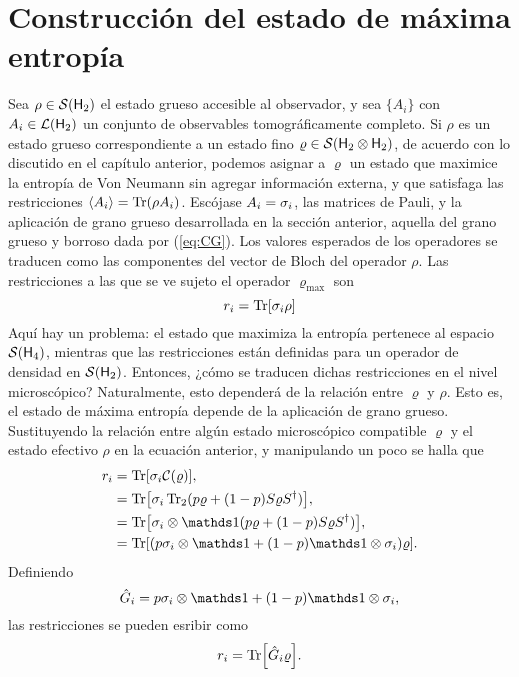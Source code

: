 \section{Construcción del estado de máxima entropía}

Sea $\rho\in\mathcal{S}({\sf H}_{2})$ el estado grueso accesible al observador, y sea $\{A_{i}\}$ con $A_{i}\in\mathcal{L}({\sf H}_{2})$ un conjunto de observables tomográficamente completo. Si $\rho$ es un estado grueso correspondiente a un estado fino $\varrho\in\mathcal{S}({\sf H}_{2}\otimes{\sf H}_{2})$, de acuerdo con lo discutido en el capítulo anterior, podemos asignar a $\varrho$ un estado que maximice la entropía de Von Neumann sin agregar información externa, y que satisfaga las restricciones $\expval{A_{i}}=\Tr(\rho A_{i})$.
Escójase ${A_{i}}={\sigma_{i}}$, las matrices de Pauli, y la aplicación de grano grueso desarrollada en la sección anterior, aquella del grano grueso y borroso dada por (\ref{eq:CG}). Los valores esperados de los operadores se traducen como las componentes del vector de Bloch del operador $\rho$. Las restricciones a las que se ve sujeto el operador $\varrho_{\max}$ son
\begin{equation*}
    r_{i}=\Tr[\sigma_{i}\rho]
\end{equation*}
Aquí hay un problema: el estado que maximiza la entropía pertenece al espacio $\mathcal{S}({\sf H}_{4})$, mientras que las restricciones están definidas para un operador de densidad en $\mathcal{S}({\sf H}_{2})$. Entonces, ¿cómo se traducen dichas restricciones en el nivel microscópico? Naturalmente, esto dependerá de la relación entre $\varrho$ y $\rho$. Esto es, el estado de máxima entropía depende de la aplicación de grano grueso. Sustituyendo la relación entre algún estado microscópico compatible $\varrho$ y el estado efectivo $\rho$ en la ecuación anterior, y manipulando un poco se halla que
\begin{align*}
    r_{i}&=\Tr[\pauli{i}\mcC(\varrho)],\\
    &=\Tr[\pauli{i}\Tr_{2}(p\varrho+(1-p)S\varrho S^{\dag})],\\
    &=\Tr[\pauli{i}\otimes\Id(p\varrho+(1-p)S\varrho S^{\dag})],\\
    &=\Tr[(p\pauli{i}\otimes\Id+(1-p)\Id\otimes\pauli{i})\varrho].
\end{align*}
Definiendo
\begin{equation}\label{eq:Ghat}
    \hat{G}_{i}=p\pauli{i}\otimes\Id+(1-p)\Id\otimes\pauli{i},
\end{equation}
las restricciones se pueden esribir como
\begin{equation}\label{eq:MaxEntRestrictions}
    r_{i}=\Tr[\hat{G}_{i}\varrho].
\end{equation}
